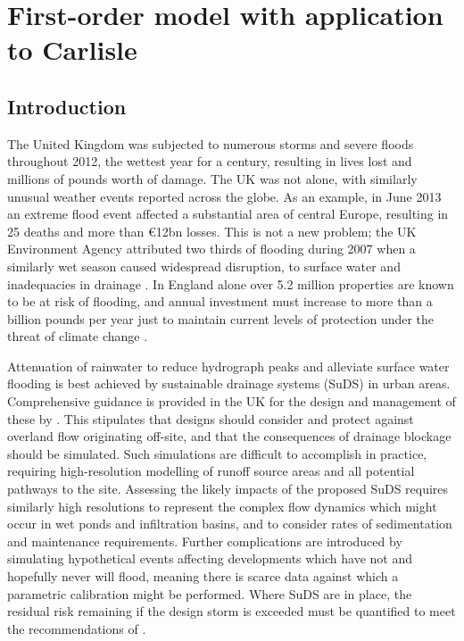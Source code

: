 \chapter{First-order model with application to Carlisle}

\section{Introduction}

The United Kingdom was subjected to numerous storms and severe floods throughout 2012, the wettest year for a century, resulting in lives lost and millions of pounds worth of damage. The UK was not alone, with similarly unusual weather events reported across the globe. As an example, in June 2013 an extreme flood event affected a substantial area of central Europe, resulting in 25 deaths and more than \euro{12bn} losses. This is not a new problem; the UK Environment Agency attributed two thirds of flooding during 2007 when a similarly wet season caused widespread disruption, to surface water and inadequacies in drainage \citep{Pitt2007}. In England alone over 5.2 million properties are known to be at risk of flooding, and annual investment must increase to more than a billion pounds per year just to maintain current levels of protection under the threat of climate change \citep{EnvironmentAgency2009a}. 

Attenuation of rainwater to reduce hydrograph peaks and alleviate surface water flooding is best achieved by sustainable drainage systems (SuDS) in urban areas. Comprehensive guidance is provided in the UK for the design and management of these by \citet{Woods-Ballard2007}. This stipulates that designs should consider and protect against overland flow originating off-site, and that the consequences of drainage blockage should be simulated. Such simulations are difficult to accomplish in practice, requiring high-resolution modelling of runoff source areas and all potential pathways to the site. Assessing the likely impacts of the proposed SuDS requires similarly high resolutions to represent the complex flow dynamics which might occur in wet ponds and infiltration basins, and to consider rates of sedimentation and maintenance requirements. Further complications are introduced by simulating hypothetical events affecting developments which have not and hopefully never will flood, meaning there is scarce data against which a parametric calibration might be performed. Where SuDS are in place, the residual risk remaining if the design storm is exceeded must be quantified to meet the recommendations of \citet{Pitt2007}.

